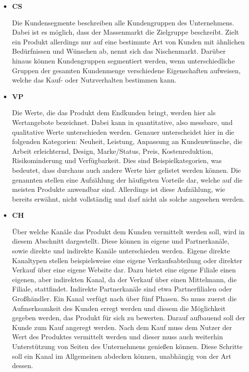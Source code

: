 \begin{itemize}
	\item \textbf{\ac{CS}}
	
	Die Kundensegmente beschreiben alle Kundengruppen des Unternehmens. Dabei ist es möglich, dass der Massenmarkt die Zielgruppe beschreibt. Zielt ein Produkt allerdings nur auf eine bestimmte Art von Kunden mit ähnlichen Bedürfnissen und Wünschen ab, nennt sich das Nischenmarkt. Darüber hinaus können Kundengruppen segmentiert werden, wenn unterschiedliche Gruppen der gesamten Kundenmenge verschiedene Eigenschaften aufweisen, welche das Kauf- oder Nutzverhalten bestimmen kann. 
	
	\item \textbf{\ac{VP}}
	
	Die Werte, die das Produkt dem Endkunden bringt, werden hier als Wertangebote bezeichnet. Dabei kann in quantitative, also messbare, und qualitative Werte unterschieden werden. Genauer unterscheidet \citeauthor{BusinessModelGeneration} hier in die folgenden Kategorien: Neuheit, Leistung, Anpassung an Kundenwünsche, die Arbeit erleichternd, Design, Marke/Status, Preis, Kostenreduktion, Risikominderung und Verfügbarkeit. Dies sind Beispielkategorien, was bedeutet, dass durchaus auch andere Werte hier gelistet werden können. Die genannten stellen eine Aufzählung der häufigsten Vorteile dar, welche auf die meisten Produkte anwendbar sind. Allerdings ist diese Aufzählung, wie bereits erwähnt, nicht vollständig und darf nicht als solche angesehen werden. 
	
	\item \textbf{\ac{CH}}
	
	Über welche Kanäle das Produkt dem Kunden vermittelt werden soll, wird in diesem Abschnitt dargestellt. Diese können in eigene und Partnerkanäle, sowie direkte und indirekte Kanäle unterschieden werden. Eigene direkte Kanaltypen stellen beispielsweise eine eigene Verkaufsabteilung oder direkter Verkauf über eine eigene Website dar. Dazu bietet eine eigene Filiale einen eigenen, aber indirekten Kanal, da der Verkauf über einen Mittelmann, die Filiale, stattfindet. Indirekte Partnerkanäle sind etwa Partnerfilialen oder Großhändler. Ein Kanal verfügt nach \citeauthor{BusinessModelGeneration} über fünf Phasen. So muss zuerst die Aufmerksamkeit des Kunden erregt werden und diesem die Möglichkeit gegeben werden, das Produkt für sich zu bewerten. Darauf aufbauend soll der Kunde zum Kauf angeregt werden. Nach dem Kauf muss dem Nutzer der Wert des Produktes vermittelt werden und dieser muss auch weiterhin Unterstützung von Seiten des Unternehmens genießen können. Diese Schritte soll ein Kanal im Allgemeinen abdecken können, unabhängig von der Art dessen.
	

\end{itemize}
